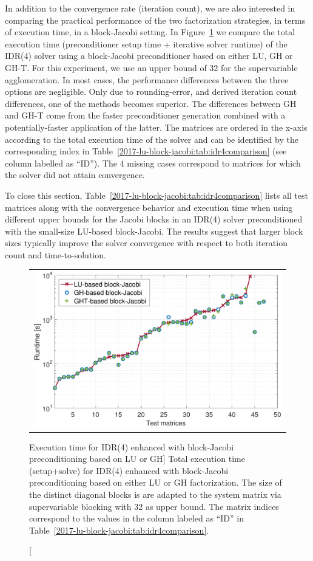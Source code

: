 In addition to the convergence rate (iteration count), we are also interested in comparing the 
practical performance of the two factorization strategies, in terms of execution time, in a block-Jacobi setting.
In Figure~\ref{2017-lu-block-jacobi:fig:runtime} we compare the total execution time (preconditioner setup time + iterative solver runtime)
of the IDR(4) solver 
using a block-Jacobi preconditioner based on either LU, GH or GH-T.
For this experiment, we use an upper bound of 32 for the supervariable agglomeration.
In most cases, the performance differences between the three options are negligible. 
Only due to rounding-error, and derived iteration count differences, one of the methods
becomes superior. The differences between GH and GH-T come from the faster
preconditioner generation
combined with a potentially-faster application of the latter.
The matrices are ordered in the x-axis according to the total execution time of the solver
and can be identified by the corresponding index in
Table~\ref{2017-lu-block-jacobi:tab:idr4comparison} (see column labelled as ``ID''). 
The 4 missing cases correspond to matrices for which the solver did not attain convergence.

To close this section, Table~\ref{2017-lu-block-jacobi:tab:idr4comparison} 
lists all test matrices along with the convergence behavior and execution time when
using different upper bounds for the Jacobi blocks in an IDR(4) solver preconditioned with the 
small-size LU-based block-Jacobi. The results suggest that larger block sizes typically improve the solver convergence
with respect to both iteration count and time-to-solution.




\begin{figure}[t]
\begin{center}
\begin{tabular}{c}
\includegraphics[width=.6\columnwidth]{plots/new_runtime_comparison_bs32}\\
\end{tabular}
\end{center}
\caption
[Execution time
for IDR(4) enhanced with block-Jacobi preconditioning based on LU or GH]
{
Total execution time (setup+solve) 
for IDR(4) enhanced with block-Jacobi preconditioning based on either LU or GH factorization.
The size of the distinct diagonal blocks is are adapted to the system matrix via supervariable 
blocking with 32 as upper bound. The matrix indices correspond to the values in the column 
labeled as ``ID'' in Table~\ref{2017-lu-block-jacobi:tab:idr4comparison}.
}
\label{2017-lu-block-jacobi:fig:runtime}
\end{figure}
